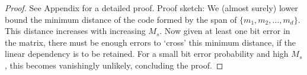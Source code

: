 \documentclass[10pt,a4paper]{amsart}
\begin{document}
\begin{proof}
    See Appendix for a detailed proof. 
    Proof sketch: We (almost surely) lower bound the minimum distance of the code formed by the span of $\{ m_1, m_2, \ldots, m_d\}$. This distance increases with increasing $M_s$. Now given at least one bit error in the matrix, there must be enough errors to `cross' this minimum distance, if the linear dependency is to be retained. For a small bit error probability and high $M_s$, this becomes vanishingly unlikely, concluding the proof.
\end{proof}
\end{document}

